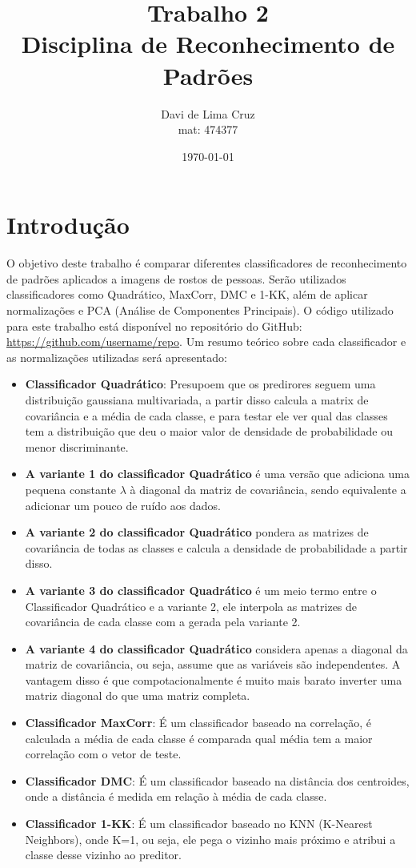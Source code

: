 \documentclass[a4paper,12pt]{article}
\title{Trabalho 2 \\ Disciplina de Reconhecimento de Padrões}
\author{Davi de Lima Cruz \\ mat: 474377}
\date{\today}
\newcommand{\nonumsection}[1]{%
  \section*{#1}%
  \addcontentsline{toc}{section}{#1}%
}
\begin{document}
\clearpage\maketitle
\thispagestyle{empty}
\nonumsection{Introdução}
O objetivo deste trabalho é comparar diferentes classificadores de reconhecimento de padrões aplicados a imagens de rostos de pessoas.
Serão utilizados classificadores como Quadrático, MaxCorr, DMC e 1-KK, além de aplicar normalizações e PCA (Análise de Componentes Principais).
O código utilizado para este trabalho está disponível no repositório do GitHub: \url{https://github.com/username/repo}.
Um resumo teórico sobre cada classificador e as normalizações utilizadas será apresentado:
\begin{itemize}
    \item \textbf{Classificador Quadrático}: Presupoem que os predirores seguem uma distribuição gaussiana multivariada,
    a partir disso calcula a matrix de covariância e a média de cada classe, e para testar ele ver qual das classes tem a
    distribuição que deu o maior valor de densidade de probabilidade ou menor discriminante.
    \item \textbf{A variante 1 do classificador Quadrático} é uma versão que adiciona uma pequena constante $\lambda$ à diagonal da matriz de covariância, sendo equivalente a adicionar um pouco de ruído aos dados.
    \item \textbf{A variante 2 do classificador Quadrático} pondera as matrizes de covariância de todas as classes e calcula a densidade de probabilidade
    a partir disso.
    \item \textbf{A variante 3 do classificador Quadrático} é um meio termo entre o Classificador Quadrático e a variante 2, ele interpola as matrizes de covariância
    de cada classe com a gerada pela variante 2.
    \item \textbf{A variante 4 do classificador Quadrático} considera apenas a diagonal da matriz de covariância, ou seja, assume que as variáveis são independentes.
     A vantagem disso é que compotacionalmente é muito mais barato inverter uma matriz diagonal do que uma matriz completa.
    \item \textbf{Classificador MaxCorr}: É um classificador baseado na correlação, é calculada a média de cada classe é comparada qual média tem a maior correlação com o vetor de teste.
    \item \textbf{Classificador DMC}: É um classificador baseado na distância dos centroides, onde a distância é medida em relação à média de cada classe.
    \item \textbf{Classificador 1-KK}: É um classificador baseado no KNN (K-Nearest Neighbors), onde K=1, ou seja, ele pega o vizinho mais próximo e atribui a classe desse vizinho ao preditor.
\end{itemize}
\end{document}

